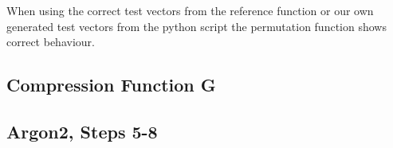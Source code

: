 When using the correct test vectors from the reference function or our own
generated test vectors from the python script the permutation function shows correct
behaviour.


\subsection{Compression Function G}
\subsection{Argon2, Steps 5-8}


